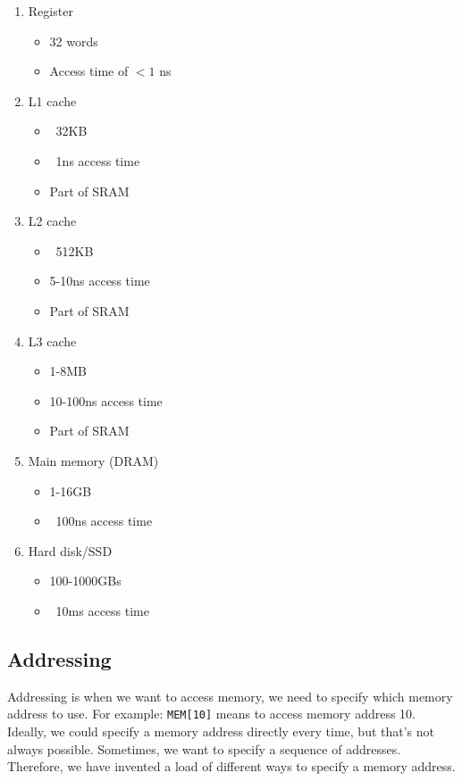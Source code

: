 \documentclass[11pt,a4paper,titlepage,dvipsnames,cmyk]{scrartcl}
\begin{document}
\begin{enumerate}
    \item Register
        \begin{itemize}
            \item 32 words
            \item Access time of $<1$ ns
        \end{itemize}
        \item L1 cache
            \begin{itemize}
                \item ~32KB
                \item ~1ns access time
                \item Part of SRAM
            \end{itemize}
        \item L2 cache
        \begin{itemize}
            \item ~512KB
            \item 5-10ns access time
            \item Part of SRAM
        \end{itemize}
        \item L3 cache
        \begin{itemize}
            \item 1-8MB
            \item 10-100ns access time
            \item Part of SRAM
        \end{itemize}
    \item Main memory (DRAM)
    \begin{itemize}
        \item 1-16GB
        \item ~100ns access time
    \end{itemize}
    \item Hard disk/SSD
        \begin{itemize}
            \item 100-1000GBs
            \item ~10ms access time
        \end{itemize}
\end{enumerate}

\subsection{Addressing}%
\label{sub:Addressing}
Addressing is when we want to access memory, we need to specify which
memory address to use. For example: \lstinline|MEM[10]| means to access
memory address 10. Ideally, we could specify a memory address directly
every time, but that's not always possible. Sometimes, we want to specify
a sequence of addresses. Therefore, we have invented a load of different
ways to specify a memory address.
\end{document}
